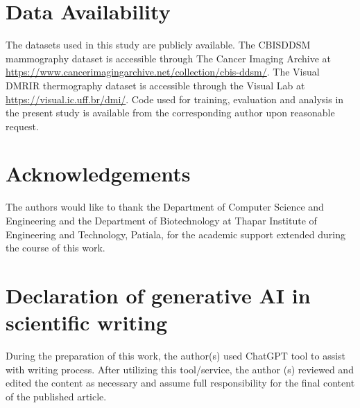 \documentclass[lettersize,journal]{IEEEtran}
\begin{document}
\section*{Data Availability}
The datasets used in this study are publicly available. The CBIS\textendash DDSM mammography dataset is accessible through The Cancer Imaging Archive at \url{https://www.cancerimagingarchive.net/collection/cbis-ddsm/}. The Visual DMR\textendash IR thermography dataset is accessible through the Visual Lab at \url{https://visual.ic.uff.br/dmi/}. Code used for training, evaluation and analysis in the present study is available from the corresponding author upon reasonable request.

\section*{Acknowledgements}
The authors would like to thank the Department of Computer Science and Engineering and the Department of Biotechnology at Thapar Institute of Engineering and Technology, Patiala, for the academic support extended during the course of this work.

\section*{Declaration of generative AI in scientific writing}
During the preparation of this work, the author(s) used ChatGPT tool to assist with writing process. After utilizing this tool/service, the author (s) reviewed and edited the content as necessary and assume full responsibility for the final content of the published article.



\end{document}
